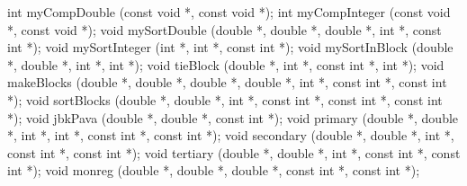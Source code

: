 \documentclass[
  12pt,
]{book}
\newenvironment{Shaded}{\begin{snugshade}}{\end{snugshade}}
\newcommand{\DataTypeTok}[1]{\textcolor[rgb]{0.13,0.29,0.53}{#1}}
\newcommand{\NormalTok}[1]{#1}
\theoremstyle{definition}
\theoremstyle{definition}
\theoremstyle{definition}
\theoremstyle{definition}
\theoremstyle{remark}
\begin{document}
\begin{Shaded}
\begin{Highlighting}[]
\DataTypeTok{int}\NormalTok{ myCompDouble (}\DataTypeTok{const} \DataTypeTok{void}\NormalTok{ *, }\DataTypeTok{const} \DataTypeTok{void}\NormalTok{ *);}
\DataTypeTok{int}\NormalTok{ myCompInteger (}\DataTypeTok{const} \DataTypeTok{void}\NormalTok{ *, }\DataTypeTok{const} \DataTypeTok{void}\NormalTok{ *);}
\DataTypeTok{void}\NormalTok{ mySortDouble (}\DataTypeTok{double}\NormalTok{ *, }\DataTypeTok{double}\NormalTok{ *, }\DataTypeTok{double}\NormalTok{ *, }\DataTypeTok{int}\NormalTok{ *, }\DataTypeTok{const} \DataTypeTok{int}\NormalTok{ *);}
\DataTypeTok{void}\NormalTok{ mySortInteger (}\DataTypeTok{int}\NormalTok{ *, }\DataTypeTok{int}\NormalTok{ *, }\DataTypeTok{const} \DataTypeTok{int}\NormalTok{ *);}
\DataTypeTok{void}\NormalTok{ mySortInBlock (}\DataTypeTok{double}\NormalTok{ *, }\DataTypeTok{double}\NormalTok{ *, }\DataTypeTok{int}\NormalTok{ *, }\DataTypeTok{int}\NormalTok{ *);}
\DataTypeTok{void}\NormalTok{ tieBlock (}\DataTypeTok{double}\NormalTok{ *, }\DataTypeTok{int}\NormalTok{ *, }\DataTypeTok{const} \DataTypeTok{int}\NormalTok{ *, }\DataTypeTok{int}\NormalTok{ *);}
\DataTypeTok{void}\NormalTok{ makeBlocks (}\DataTypeTok{double}\NormalTok{ *, }\DataTypeTok{double}\NormalTok{ *, }\DataTypeTok{double}\NormalTok{ *, }\DataTypeTok{double}\NormalTok{ *, }\DataTypeTok{int}\NormalTok{ *, }\DataTypeTok{const} \DataTypeTok{int}\NormalTok{ *, }\DataTypeTok{const} \DataTypeTok{int}\NormalTok{ *);}
\DataTypeTok{void}\NormalTok{ sortBlocks (}\DataTypeTok{double}\NormalTok{ *, }\DataTypeTok{double}\NormalTok{ *, }\DataTypeTok{int}\NormalTok{ *, }\DataTypeTok{const} \DataTypeTok{int}\NormalTok{ *, }\DataTypeTok{const} \DataTypeTok{int}\NormalTok{ *, }\DataTypeTok{const} \DataTypeTok{int}\NormalTok{ *);}
\DataTypeTok{void}\NormalTok{ jbkPava (}\DataTypeTok{double}\NormalTok{ *, }\DataTypeTok{double}\NormalTok{ *, }\DataTypeTok{const} \DataTypeTok{int}\NormalTok{ *);}
\DataTypeTok{void}\NormalTok{ primary (}\DataTypeTok{double}\NormalTok{ *, }\DataTypeTok{double}\NormalTok{ *, }\DataTypeTok{int}\NormalTok{ *, }\DataTypeTok{int}\NormalTok{ *, }\DataTypeTok{const} \DataTypeTok{int}\NormalTok{ *, }\DataTypeTok{const} \DataTypeTok{int}\NormalTok{ *);}
\DataTypeTok{void}\NormalTok{ secondary (}\DataTypeTok{double}\NormalTok{ *, }\DataTypeTok{double}\NormalTok{ *, }\DataTypeTok{int}\NormalTok{ *, }\DataTypeTok{const} \DataTypeTok{int}\NormalTok{ *, }\DataTypeTok{const} \DataTypeTok{int}\NormalTok{ *);}
\DataTypeTok{void}\NormalTok{ tertiary (}\DataTypeTok{double}\NormalTok{ *, }\DataTypeTok{double}\NormalTok{ *, }\DataTypeTok{int}\NormalTok{ *, }\DataTypeTok{const} \DataTypeTok{int}\NormalTok{ *, }\DataTypeTok{const} \DataTypeTok{int}\NormalTok{ *);}
\DataTypeTok{void}\NormalTok{ monreg (}\DataTypeTok{double}\NormalTok{ *, }\DataTypeTok{double}\NormalTok{ *, }\DataTypeTok{double}\NormalTok{ *, }\DataTypeTok{const} \DataTypeTok{int}\NormalTok{ *, }\DataTypeTok{const} \DataTypeTok{int}\NormalTok{ *);}


\end{Highlighting}
\end{Shaded}
\end{document}
